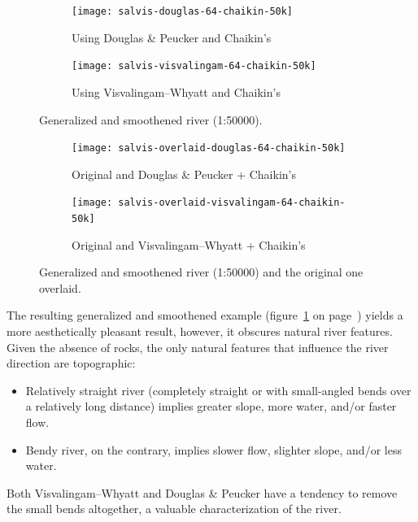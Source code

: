 \documentclass[a4paper]{article}
\newcommand{\onpage}[1]{\ref{#1} on page~\pageref{#1}}
\newcommand{\DP}{Douglas \& Peucker}
\newcommand{\VW}{Visvalingam--Whyatt}
\begin{document}
\begin{figure}[h]
    \centering
    \begin{subfigure}[b]{.49\textwidth}
        \texttt{[image: salvis-douglas-64-chaikin-50k]}
        \caption{Using {\DP} and Chaikin's}
    \end{subfigure}
    \hfill
    \begin{subfigure}[b]{.49\textwidth}
        \texttt{[image: salvis-visvalingam-64-chaikin-50k]}
        \caption{Using {\VW} and Chaikin's}
    \end{subfigure}
    \caption{Generalized and smoothened river (1:50000).}
    \label{fig:salvis-generalized-chaikin-50k}
\end{figure}

\begin{figure}[h]
    \centering
    \begin{subfigure}[b]{.49\textwidth}
        \texttt{[image: salvis-overlaid-douglas-64-chaikin-50k]}
        \caption{Original and {\DP} + Chaikin's}
    \end{subfigure}
    \hfill
    \begin{subfigure}[b]{.49\textwidth}
        \texttt{[image: salvis-overlaid-visvalingam-64-chaikin-50k]}
        \caption{Original and {\VW} + Chaikin's}
    \end{subfigure}
    \caption{Generalized and smoothened river (1:50000) and the original one overlaid.}
    \label{fig:salvis-overlaid-generalized-chaikin-50k}
\end{figure}

The resulting generalized and smoothened example
(figure~\onpage{fig:salvis-generalized-chaikin-50k}) yields a more
aesthetically pleasant result, however, it obscures natural river features.
Given the absence of rocks, the only natural features that influence the river
direction are topographic:

\begin{itemize}

    \item Relatively straight river (completely straight or with small-angled
        bends over a relatively long distance) implies greater slope, more
        water, and/or faster flow.

    \item Bendy river, on the contrary, implies slower flow, slighter slope,
        and/or less water.

\end{itemize}

Both {\VW} and {\DP} have a tendency to remove the small bends altogether, a
valuable characterization of the river.
\end{document}
